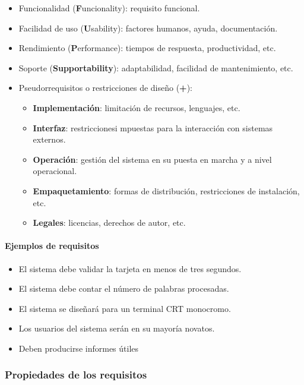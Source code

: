 \documentclass[12pt,spanish]{article}
\begin{document}
\begin{itemize}
	\item Funcionalidad (\textbf{F}uncionality): requisito funcional.
	\item Facilidad de uso (\textbf{U}sability): factores humanos, ayuda, documentación.
	\item Rendimiento (\textbf{P}erformance): tiempos de respuesta, productividad, etc.
	\item Soporte (\textbf{Supportability}): adaptabilidad, facilidad de mantenimiento, etc.
	\item Pseudorrequisitos o restricciones de diseño (\textbf{+}):
		\begin{itemize}
			\item \textbf{Implementación}: limitación de recursos, lenguajes, etc.
			\item \textbf{Interfaz}: restriccionesi mpuestas para la interacción con sistemas externos.
			\item \textbf{Operación}: gestión del sistema en su puesta en marcha y a nivel operacional.
			\item \textbf{Empaquetamiento}: formas de distribución, restricciones de instalación, etc.
			\item \textbf{Legales}: licencias, derechos de autor, etc.
		\end{itemize}
\end{itemize}

\paragraph{Ejemplos de requisitos}

\begin{itemize}
	\item El sistema debe validar la tarjeta en menos de tres segundos.
	\item El sistema debe contar el número de palabras procesadas.
	\item El sistema se diseñará para un terminal CRT monocromo.
	\item Los usuarios del sistema serán en su mayoría novatos.
	\item Deben producirse informes útiles
\end{itemize}



\subsubsection{Propiedades de los requisitos}
\end{document}
